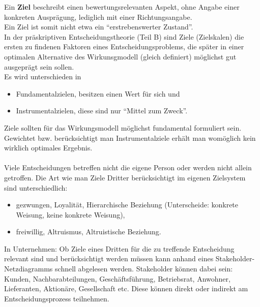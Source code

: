 Ein \textbf{Ziel} beschreibt einen bewertungsrelevanten Aspekt, ohne Angabe einer konkreten Ausprägung, lediglich mit einer Richtungsangabe.\\
Ein Ziel ist somit nicht etwa ein ``erstrebenswerter Zustand''.\\
In der präskriptiven Entscheidungstheorie (Teil B) sind Ziele (Zielskalen) die ersten zu findenen Faktoren eines Entscheidungsproblems, die später in einer optimalen Alternative des Wirkunsgmodell (gleich definiert) möglichst gut ausgeprägt sein sollen.\\
Es wird unterschieden in
\begin{itemize}
	\item Fundamentalzielen, besitzen einen Wert für sich und
	\item Instrumentalzielen, diese sind nur ``Mittel zum Zweck''.
\end{itemize}
Ziele sollten für das Wirkungsmodell möglichst fundamental formuliert sein. Gewichtet bzw. berücksichtigt man Instrumentalziele erhält man womöglich kein wirklich optimales Ergebnis.\\
\ \\
Viele Entscheidungen betreffen nicht die eigene Person oder werden nicht allein getroffen. Die Art wie man Ziele Dritter berücksichtigt im eigenen Zielsystem sind unterschiedlich:
\begin{itemize}
	\item gezwungen, Loyalität, Hierarchische Beziehung (Unterscheide: konkrete Weisung, keine konkrete Weisung),
	\item freiwillig, Altruismus, Altruistische Beziehung.
\end{itemize}
In Unternehmen: Ob Ziele eines Dritten für die zu treffende Entscheidung relevant sind und berücksichtigt werden müssen kann anhand eines Stakeholder-Netzdiagramms schnell abgelesen werden. Stakeholder können dabei sein: Kunden, Nachbarabteilungen, Geschäftsführung, Betriebsrat, Anwohner, Lieferanten, Aktionäre, Gesellschaft etc. Diese können direkt oder indirekt am Entscheidungsprozess teilnehmen.\\

